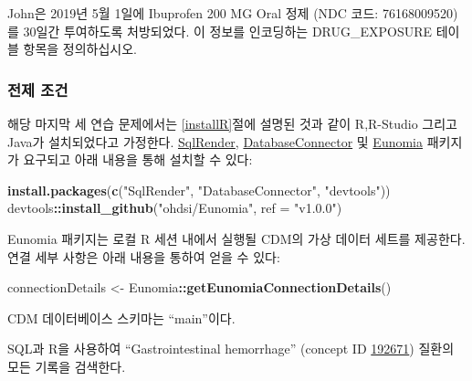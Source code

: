 \documentclass[11pt]{book}
\newenvironment{Shaded}{\begin{snugshade}}{\end{snugshade}}
\newcommand{\KeywordTok}[1]{\textcolor[rgb]{0.13,0.29,0.53}{\textbf{#1}}}
\newcommand{\DataTypeTok}[1]{\textcolor[rgb]{0.13,0.29,0.53}{#1}}
\newcommand{\StringTok}[1]{\textcolor[rgb]{0.31,0.60,0.02}{#1}}
\newcommand{\OperatorTok}[1]{\textcolor[rgb]{0.81,0.36,0.00}{\textbf{#1}}}
\newcommand{\NormalTok}[1]{#1}
\theoremstyle{definition}
\theoremstyle{definition}
\theoremstyle{definition}
\theoremstyle{remark}
\let\BeginKnitrBlock\begin \let\EndKnitrBlock\end
\begin{document}
\BeginKnitrBlock{exercise}
\protect\hypertarget{exr:exerciseJohnDrug}{}{\label{exr:exerciseJohnDrug}
}John은 2019년 5월 1일에 Ibuprofen 200 MG Oral 정제 (NDC 코드:
76168009520)를 30일간 투여하도록 처방되었다. 이 정보를 인코딩하는
DRUG\_EXPOSURE 테이블 항목을 정의하십시오.
\EndKnitrBlock{exercise}

\subsubsection*{전제 조건}\label{--1}

해당 마지막 세 연습 문제에서는 \ref{installR}절에 설명된 것과 같이
R,R-Studio 그리고 Java가 설치되었다고 가정한다.
\href{https://ohdsi.github.io/SqlRender/}{SqlRender},
\href{https://ohdsi.github.io/DatabaseConnector/}{DatabaseConnector} 및
\href{https://ohdsi.github.io/Eunomia/}{Eunomia} 패키지가 요구되고 아래
내용을 통해 설치할 수 있다:

\begin{Shaded}
\begin{Highlighting}[]
\KeywordTok{install.packages}\NormalTok{(}\KeywordTok{c}\NormalTok{(}\StringTok{"SqlRender"}\NormalTok{, }\StringTok{"DatabaseConnector"}\NormalTok{, }\StringTok{"devtools"}\NormalTok{))}
\NormalTok{devtools}\OperatorTok{::}\KeywordTok{install_github}\NormalTok{(}\StringTok{"ohdsi/Eunomia"}\NormalTok{, }\DataTypeTok{ref =} \StringTok{"v1.0.0"}\NormalTok{)}
\end{Highlighting}
\end{Shaded}

Eunomia 패키지는 로컬 R 세션 내에서 실행될 CDM의 가상 데이터 세트를
제공한다. 연결 세부 사항은 아래 내용을 통하여 얻을 수 있다:

\begin{Shaded}
\begin{Highlighting}[]
\NormalTok{connectionDetails <-}\StringTok{ }\NormalTok{Eunomia}\OperatorTok{::}\KeywordTok{getEunomiaConnectionDetails}\NormalTok{()}
\end{Highlighting}
\end{Shaded}

CDM 데이터베이스 스키마는 ``main''이다.

\BeginKnitrBlock{exercise}
\protect\hypertarget{exr:exerciseGiBleedRecords}{}{\label{exr:exerciseGiBleedRecords}
}SQL과 R을 사용하여 ``Gastrointestinal hemorrhage'' (concept ID
\href{http://athena.ohdsi.org/search-terms/terms/192671}{192671}) 질환의
모든 기록을 검색한다.
\EndKnitrBlock{exercise}
\end{document}
